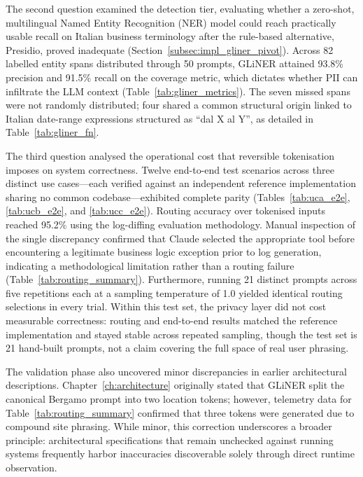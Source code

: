 The second question examined the detection tier, evaluating whether a zero-shot, multilingual Named Entity Recognition (NER) model could reach practically usable recall on Italian business terminology after the rule-based alternative, Presidio, proved inadequate (Section~\ref{subsec:impl_gliner_pivot}). Across 82 labelled entity spans distributed through 50 prompts, GLiNER attained 93.8\% precision and 91.5\% recall on the coverage metric, which dictates whether PII can infiltrate the LLM context (Table~\ref{tab:gliner_metrics}). The seven missed spans were not randomly distributed; four shared a common structural origin linked to Italian date-range expressions structured as ``dal X al Y'', as detailed in Table~\ref{tab:gliner_fn}.

The third question analysed the operational cost that reversible tokenisation imposes on system correctness. Twelve end-to-end test scenarios across three distinct use cases---each verified against an independent reference implementation sharing no common codebase---exhibited complete parity (Tables~\ref{tab:uca_e2e}, \ref{tab:ucb_e2e}, and \ref{tab:ucc_e2e}). Routing accuracy over tokenised inputs reached 95.2\% using the log-diffing evaluation methodology. Manual inspection of the single discrepancy confirmed that Claude selected the appropriate tool before encountering a legitimate business logic exception prior to log generation, indicating a methodological limitation rather than a routing failure (Table~\ref{tab:routing_summary}). Furthermore, running 21 distinct prompts across five repetitions each at a sampling temperature of 1.0 yielded identical routing selections in every trial. Within this test set, the privacy layer did not cost measurable correctness: routing and end-to-end results matched the reference implementation and stayed stable across repeated sampling, though the test set is 21 hand-built prompts, not a claim covering the full space of real user phrasing.

The validation phase also uncovered minor discrepancies in earlier architectural descriptions. Chapter~\ref{ch:architecture} originally stated that GLiNER split the canonical Bergamo prompt into two location tokens; however, telemetry data for Table~\ref{tab:routing_summary} confirmed that three tokens were generated due to compound site phrasing. While minor, this correction underscores a broader principle: architectural specifications that remain unchecked against running systems frequently harbor inaccuracies discoverable solely through direct runtime observation.

